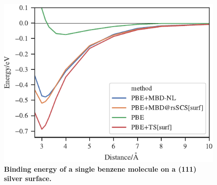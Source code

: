 \begin{figure}[t!]
\centering
\includegraphics[width=\linewidth]{../media/surface.pdf}
\caption{\textbf{Binding energy of a single benzene molecule on a (111) silver surface.}
}\label{fig:silver-benzene}
\end{figure}

